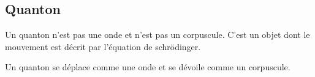

\subsection{Quanton}
%
Un quanton n'est pas une onde et n'est pas un corpuscule. C'est un objet dont le mouvement est décrit par l'équation de schrödinger.

Un quanton se déplace comme une onde et se dévoile comme un corpuscule.

